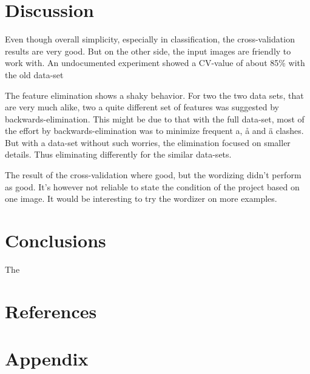 \documentclass[a4paper,11pt]{article}
\begin{document}
\section{Discussion}

Even though overall simplicity, especially in classification, the cross-validation results are very good.
But on the other side, the input images are friendly to work with.
An undocumented experiment showed a CV-value of about 85\% with the old data-set 

The feature elimination shows a shaky behavior.
For two the two data sets, that are very much alike,
two a quite different set of features was suggested by backwards-elimination.
This might be due to that with the full data-set,
most of the effort by backwards-elimination was to minimize frequent a, å and ä clashes.
But with a data-set without such worries, the elimination focused on smaller details.
Thus eliminating differently for the similar data-sets.

The result of the cross-validation where good, but the wordizing didn't perform as good.
It's however not reliable to state the condition of the project
based on one image. It would be interesting to try the wordizer on more examples.

\section{Conclusions}
The

\section{References}
\section{Appendix}
\end{document}
